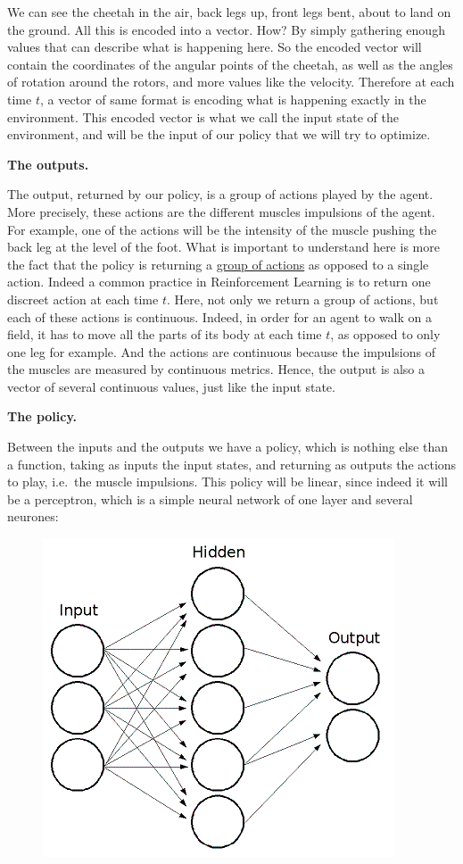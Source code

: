 \documentclass[]{book}
\begin{document}
We can see the cheetah in the air, back legs up, front legs bent, about to land on the ground. All this is encoded into a vector. How? By simply gathering enough values that can describe what is happening here. So the encoded vector will contain the coordinates of the angular points of the cheetah, as well as the angles of rotation around the rotors, and more values like the velocity. Therefore at each time \(t\), a vector of same format is encoding what is happening exactly in the environment. This encoded vector is what we call the input state of the environment, and will be the input of our policy that we will try to optimize.

\textbf{The outputs.}

The output, returned by our policy, is a group of actions played by the agent. More precisely, these actions are the different muscles impulsions of the agent. For example, one of the actions will be the intensity of the muscle pushing the back leg at the level of the foot. What is important to understand here is more the fact that the policy is returning a \underline{group of actions} as opposed to a single action. Indeed a common practice in Reinforcement Learning is to return one discreet action at each time \(t\). Here, not only we return a group of actions, but each of these actions is continuous. Indeed, in order for an agent to walk on a field, it has to move all the parts of its body at each time \(t\), as opposed to only one leg for example. And the actions are continuous because the impulsions of the muscles are measured by continuous metrics. Hence, the output is also a vector of several continuous values, just like the input state.

\textbf{The policy.}

Between the inputs and the outputs we have a policy, which is nothing else than a function, taking as inputs the input states, and returning as outputs the actions to play, i.e.~the muscle impulsions. This policy will be linear, since indeed it will be a perceptron, which is a simple neural network of one layer and several neurones:

\begin{figure}[!htbp]
        \begin{center}
            \includegraphics[scale=1]{Perceptron.png}
        \end{center}
\end{figure}
\end{document}
